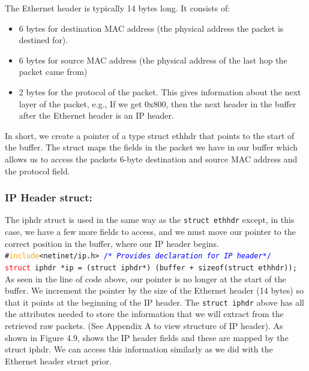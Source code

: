 \documentclass{uathesis}
\begin{document}
The Ethernet header is typically 14 bytes long. It consists of:

\begin{itemize}
\item 6 bytes for destination MAC address (the physical address the packet is destined for).
\item 6 bytes for source MAC address (the physical address of the last hop the packet came from)
\item 2 bytes for the protocol of the packet. This gives information about the next layer of the packet, e.g., If we get 0x800, then the next header in the buffer after the Ethernet header is an IP header. \\
\end{itemize}

In short, we create a pointer of a type struct ethhdr that points to the start of the buffer. The struct maps the fields in the packet we have in our buffer which allows us to access the packets 6-byte destination and source MAC address and the protocol field. 

\subsubsection*{IP Header struct:}
The iphdr struct is used in the same way as the {\tt struct ethhdr} except, in this case, we have a few more fields to access, and we must move our pointer to the correct position in the buffer, where our IP header begins. \\
{\tt{\#}\textcolor{orange}{include}<netinet/ip.h> \textcolor{blue}{{\//*} \emph{Provides declaration for IP header}{\/*/}} \\

\noindent \textcolor{red}{struct} iphdr *ip = (struct iphdr*) (buffer + sizeof(struct ethhdr));}\\

As seen in the line of code above, our pointer is no longer at the start of the buffer. We increment the pointer by the size of the Ethernet header (14 bytes) so that it points at the beginning of the IP header. The {\tt struct iphdr} above has all the attributes needed to store the information that we will extract from the retrieved raw packets. (See Appendix A to view structure of IP header). As shown in Figure 4.9, shows the IP header fields and these are mapped by the struct iphdr. We can access this information similarly as we did with the Ethernet header struct prior. \\
\end{document}
